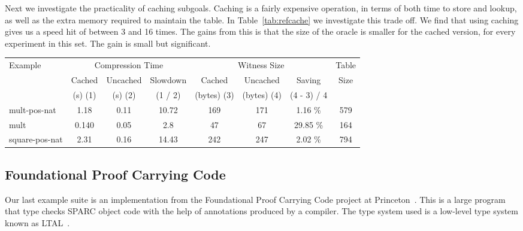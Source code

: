 \documentclass{llncs}
\begin{document}
Next we investigate the practicality of caching subgoals. Caching is 
a fairly expensive operation, in terms of both time to store and lookup, 
as well as the extra memory required to maintain the table. In 
Table~\ref{tab:refcache} we investigate this trade off. We find that
using caching gives us a speed hit of between 3 and 16 times. The 
gains from this is that the size of the oracle is smaller for the
cached version, for every experiment in this set. The gain is small
but significant.

\begin{table*}[htbp]
\begin{center}
\begin{small}
\begin{tabular}{|l|c|c|c|c|c|c|c|}
\hline
Example & \multicolumn{3}{c}{Compression Time} & 
\multicolumn{3}{c}{Witness Size} & Table\\
& Cached & Uncached & Slowdown & Cached & Uncached & Saving & Size\\
& (s) (1) & (s) (2) & (1 / 2) & (bytes) (3) & (bytes) (4) & (4 - 3) / 4& \\
\hline
mult-pos-nat & 1.18 & 0.11 & 10.72 & 169 & 171 & 1.16 \% & 579\\
mult & 0.140 & 0.05 & 2.8 & 47 & 67 & 29.85 \% & 164\\
square-pos-nat & 2.31 & 0.16 & 14.43 & 242 & 247 & 2.02 \% & 794\\
\hline
\end{tabular}
\end{small}
\end{center}
\caption{\label{tab:refcache} 
Refinement Type System : 
Caching during proof compression}
\end{table*}

\subsection{Foundational Proof Carrying Code}
Our last example suite is an implementation from the Foundational 
Proof Carrying Code project at Princeton~\cite{Appel01lics}. This 
is a large program that type checks SPARC object code with the help 
of annotations produced by a compiler. The type system used is a
low-level type system known as LTAL~\cite{chen+:fpcc-ltal}.
\end{document}
